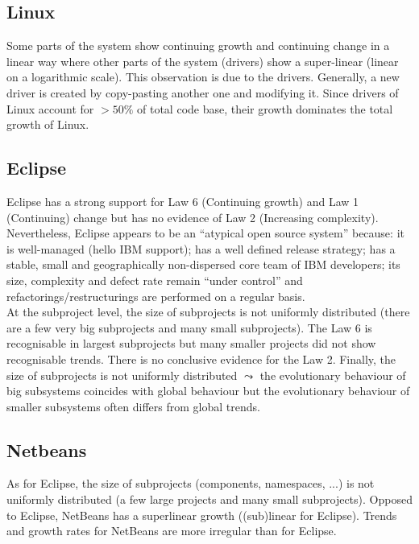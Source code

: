 \documentclass[a4paper,11pt]{report}
\begin{document}
\subsection{Linux}
Some parts of the system show continuing growth and continuing change in a
linear way where other parts of the system (drivers) show a super-linear
(linear on a logarithmic scale). This observation is due to the drivers.
Generally, a new driver is created by copy-pasting another one and modifying it.
Since drivers of Linux account for \underline{$>50\%$} of total code base,
their growth dominates the total growth of Linux.

\subsection{Eclipse}
Eclipse has a strong support for Law 6 (Continuing growth) and Law 1
(Continuing) change but has no evidence of Law 2 (Increasing complexity).
Nevertheless, Eclipse appears to be an ``atypical open source system'' because:
it is well-managed (hello IBM support); has a well defined release strategy;
has a stable, small and geographically non-dispersed core team of IBM
developers; its size, complexity and defect rate remain ``under control'' and
refactorings/restructurings are performed on a regular basis.\\

At the subproject level, the size of subprojects is not uniformly distributed
(there are a few very big subprojects and many small subprojects). The Law 6
is recognisable in largest subprojects but many smaller projects did not show
recognisable trends. There is no conclusive evidence for the Law 2. Finally,
the size of subprojects is not uniformly distributed $\leadsto$ the evolutionary
behaviour of big subsystems coincides with global behaviour but the evolutionary
behaviour of smaller subsystems often differs from global trends.

\subsection{Netbeans}
As for Eclipse, the size of subprojects (components, namespaces, ...) is not
uniformly distributed (a few large projects and many small subprojects).
Opposed to Eclipse, NetBeans has a superlinear growth ((sub)linear for Eclipse).
Trends and growth rates for NetBeans are more irregular than for Eclipse.
\end{document}

